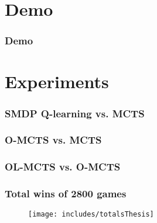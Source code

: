 \documentclass[aspectratio=169]{beamer}
\begin{document}
\section{Demo}
\begin{frame}
	\frametitle{Demo}
\end{frame}

\section{Experiments}
\begin{frame}
	\frametitle{SMDP Q-learning vs. MCTS}
	\begin{figure}
	\centering
	\end{figure}
	\begin{figure}
	\centering
	\end{figure}
\end{frame}

\begin{frame}
	\frametitle{O-MCTS vs. MCTS}
	\begin{figure}
	\centering
	\end{figure}
	\begin{figure}
	\centering
	\end{figure}
\end{frame}

\begin{frame}
	\frametitle{OL-MCTS vs. O-MCTS}
	\begin{figure}
	\centering
	\end{figure}
	\begin{figure}
	\centering
	\end{figure}
\end{frame}

\begin{frame}
	\frametitle{Total wins of 2800 games}
	\begin{figure}
	\centering
	\texttt{[image: includes/totalsThesis]}
	\end{figure}
\end{frame}
\end{document}
